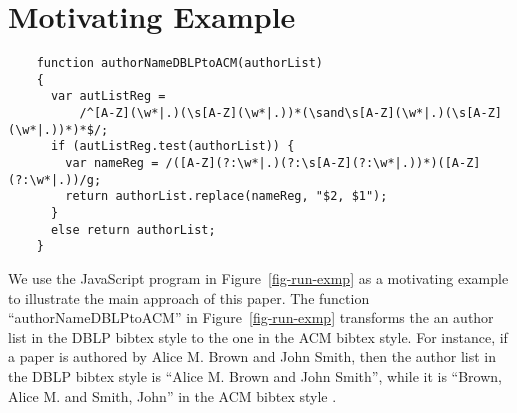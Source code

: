 
\section{Motivating Example}\label{sec:mot}

\begin{figure*}[htbp]
\begin{center}
{
\small
\begin{verbatim}
    function authorNameDBLPtoACM(authorList)
    {
      var autListReg = 
          /^[A-Z](\w*|.)(\s[A-Z](\w*|.))*(\sand\s[A-Z](\w*|.)(\s[A-Z](\w*|.))*)*$/;
      if (autListReg.test(authorList)) {
        var nameReg = /([A-Z](?:\w*|.)(?:\s[A-Z](?:\w*|.))*)([A-Z](?:\w*|.))/g;
        return authorList.replace(nameReg, "$2, $1");
      }
      else return authorList;
    }
\end{verbatim}
}
\end{center}
\caption{Change the author list from the DBLP format to the ACM format}
\label{fig-run-exmp}
\end{figure*}



We use the JavaScript program in Figure~\ref{fig-run-exmp} as a motivating example to illustrate the main approach of this paper. The function ``authorNameDBLPtoACM'' in Figure~\ref{fig-run-exmp} transforms the %
an author list in the DBLP bibtex style to the one in the ACM bibtex style. For instance,  if a paper is authored by Alice M. Brown and John Smith, then the author list in the DBLP bibtex style is ``Alice M. Brown and John Smith'', while it is ``Brown, Alice M. and Smith, John'' in the ACM bibtex style . 

